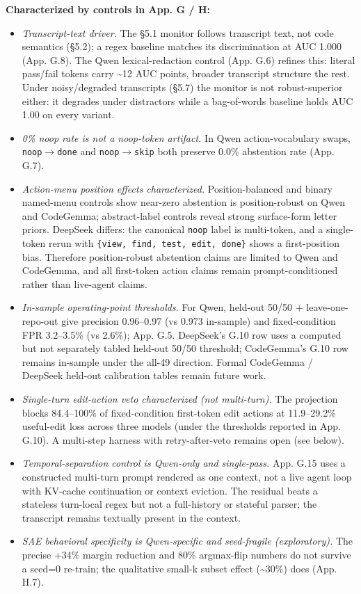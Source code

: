 \documentclass[
  11pt,
  a4paper]{article}
\providecommand{\tightlist}{%
  \setlength{\itemsep}{0pt}\setlength{\parskip}{0pt}}
\begin{document}
\textbf{Characterized by controls in App. G / H:}

\begin{itemize}
\tightlist
\item
  \emph{Transcript-text driver.} The \S{}5.1 monitor follows transcript
  text, not code semantics (\S{}5.2); a regex baseline matches its
  discrimination at AUC 1.000 (App. G.8). The Qwen lexical-redaction
  control (App. G.6) refines this: literal pass/fail tokens carry
  \textasciitilde12 AUC points, broader transcript structure the rest.
  Under noisy/degraded transcripts (\S{}5.7) the monitor is not
  robust-superior either: it degrades under distractors while a
  bag-of-words baseline holds AUC 1.00 on every variant.
\item
  \emph{0\% noop rate is not a noop-token artifact.} In Qwen
  action-vocabulary swaps, \texttt{noop}\ensuremath{\rightarrow}\texttt{done} and
  \texttt{noop}\ensuremath{\rightarrow}\texttt{skip} both preserve 0.0\% abstention rate (App.
  G.7).
\item
  \emph{Action-menu position effects characterized.} Position-balanced
  and binary named-menu controls show near-zero abstention is
  position-robust on Qwen and CodeGemma; abstract-label controls reveal
  strong surface-form letter priors. DeepSeek differs: the canonical
  \texttt{noop} label is multi-token, and a single-token rerun with
  \texttt{\{view,\ find,\ test,\ edit,\ done\}} shows a first-position
  bias. Therefore position-robust abstention claims are limited to Qwen
  and CodeGemma, and all first-token action claims remain
  prompt-conditioned rather than live-agent claims.
\item
  \emph{In-sample operating-point thresholds.} For Qwen, held-out 50/50
  + leave-one-repo-out give precision 0.96--0.97 (vs 0.973 in-sample)
  and fixed-condition FPR 3.2--3.5\% (vs 2.6\%); App. G.5. DeepSeek's
  G.10 row uses a computed but not separately tabled held-out 50/50
  threshold; CodeGemma's G.10 row remains in-sample under the all-49
  direction. Formal CodeGemma / DeepSeek held-out calibration tables
  remain future work.
\item
  \emph{Single-turn edit-action veto characterized (not multi-turn).}
  The projection blocks 84.4--100\% of fixed-condition first-token edit
  actions at 11.9--29.2\% useful-edit loss across three models (under
  the thresholds reported in App. G.10). A multi-step harness with
  retry-after-veto remains open (see below).
\item
  \emph{Temporal-separation control is Qwen-only and single-pass.} App.
  G.15 uses a constructed multi-turn prompt rendered as one context, not
  a live agent loop with KV-cache continuation or context eviction. The
  residual beats a stateless turn-local regex but not a full-history or
  stateful parser; the transcript remains textually present in the
  context.
\item
  \emph{SAE behavioral specificity is Qwen-specific and seed-fragile
  (exploratory).} The precise +34\% margin reduction and 80\%
  argmax-flip numbers do not survive a seed=0 re-train; the qualitative
  small-k subset effect (\textasciitilde30\%) does (App. H.7).
\end{itemize}
\end{document}
